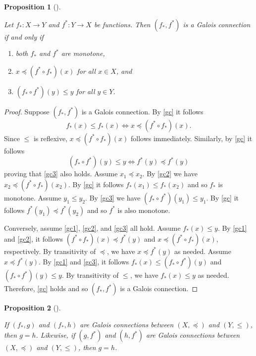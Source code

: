 \documentclass[
  twoside,
  12pt,
  letterpaper,
  fleqn]{article}
\providecommand{\tightlist}{%
  \setlength{\itemsep}{0pt}\setlength{\parskip}{0pt}}\usepackage{longtable,booktabs,array}
\theoremstyle{definition}
\theoremstyle{definition}
\theoremstyle{plain}
\newtheorem{proposition}{Proposition}[section]
\theoremstyle{remark}
\begin{document}
\begin{proposition}[]\protect\hypertarget{prp-galois-connection-if-and-only-if}{}\label{prp-galois-connection-if-and-only-if}

Let \(f_*:X\to Y\) and \(f^*:Y\to X\) be functions. Then \((f_*, f^*)\)
is a Galois connection if and only if

\begin{enumerate}
\def\labelenumi{\arabic{enumi}.}
\tightlist
\item
  both \(f_*\) and \(f^*\) are monotone,
\item
  \(x\preceq (f^*\circ f_*)(x)\) for all \(x\in X\), and
\item
  \((f_* \circ f^*)(y)\leqslant y\) for all \(y\in Y\).
\end{enumerate}

\end{proposition}

\begin{proof}

Suppose \((f_*, f^*)\) is a Galois connection. By \eqref{gc} it follows
\[
f_*(x)\leqslant f_*(x) \Longleftrightarrow x\preceq (f^*\circ f_*)(x). 
\] Since \(\leqslant\) is reflexive, \(x\preceq (f^*\circ f_*)(x)\)
follows immediately. Similarly, by \eqref{gc} it follows \[
(f_*\circ f^*)(y)\leqslant y \Longleftrightarrow f^*(y)\preceq f^*(y)
\] proving that \eqref{gc3} also holds. Assume \(x_1\preceq x_2\). By
\eqref{gc2} we have \(x_2\preceq (f^*\circ f_*)(x_2)\). By \eqref{gc} it
follows \(f_*(x_1)\leqslant f_*(x_2)\) and so \(f_*\) is monotone.
Assume \(y_1\leqslant y_2\). By \eqref{gc3} we have
\((f_*\circ f^*)(y_1)\leqslant y_1\). By \eqref{gc} it follows
\(f^*(y_1)\preceq f^*(y_2)\) and so \(f^*\) is also monotone.

Conversely, assume \eqref{gc1}, \eqref{gc2}, and \eqref{gc3} all hold.
Assume \(f_*(x)\leqslant y\). By \eqref{gc1} and \eqref{gc2}, it follows
\((f^*\circ f_*)(x)\preceq f^*(y)\) and \(x\preceq (f^*\circ f_*)(x)\),
respectively. By transitivity of \(\preceq\), we have
\(x\preceq f^*(y)\) as needed. Assume \(x\preceq f^*(y)\). By
\eqref{gc1} and \eqref{gc3}, it follows
\(f_*(x)\leqslant (f_*\circ f^*)(y)\) and
\((f_*\circ f^*)(y)\leqslant y\). By transitivity of \(\leqslant\), we
have \(f_*(x)\leqslant y\) as needed. Therefore, \eqref{gc} holds and so
\((f_*, f^*)\) is a Galois connection.

\end{proof}

\begin{proposition}[]\protect\hypertarget{prp-galois-connections-uniqueness}{}\label{prp-galois-connections-uniqueness}

If \((f_*,g)\) and \((f_*, h)\) are Galois connections between
\((X,\preceq)\) and \((Y,\leqslant)\), then \(g=h\). Likewise, if
\((g, f^*)\) and \((h,f^*)\) are Galois connections between
\((X,\preceq)\) and \((Y,\leqslant)\), then \(g=h\).

\end{proposition}
\end{document}
